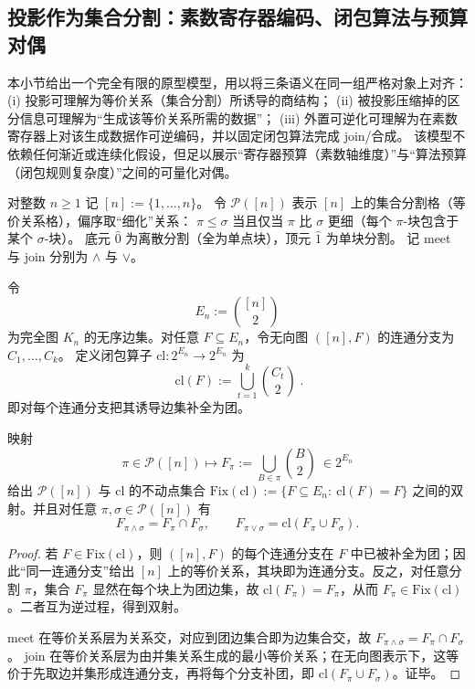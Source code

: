 \subsection{投影作为集合分割：素数寄存器编码、闭包算法与预算对偶}\label{subsec:pom-projection-as-partition-prime-register}
本小节给出一个完全有限的原型模型，用以将三条语义在同一组严格对象上对齐：
(i) 投影可理解为等价关系（集合分割）所诱导的商结构；
(ii) 被投影压缩掉的区分信息可理解为“生成该等价关系所需的数据”；
(iii) 外置可逆化可理解为在素数寄存器上对该生成数据作可逆编码，并以固定闭包算法完成 join/合成。
该模型不依赖任何渐近或连续化假设，但足以展示“寄存器预算（素数轴维度）”与“算法预算（闭包规则复杂度）”之间的可量化对偶。

\begin{definition}[集合分割格]\label{def:pom-partition-lattice}
对整数 \(n\ge 1\) 记 \([n]:=\{1,\dots,n\}\)。
令 \(\mathcal{P}([n])\) 表示 \([n]\) 上的集合分割格（等价关系格），偏序取“细化”关系：
\(\pi\le\sigma\) 当且仅当 \(\pi\) 比 \(\sigma\) 更细（每个 \(\pi\)-块包含于某个 \(\sigma\)-块）。
底元 \(\hat 0\) 为离散分割（全为单点块），顶元 \(\hat 1\) 为单块分割。
记 meet 与 join 分别为 \(\wedge\) 与 \(\vee\)。
\end{definition}

\begin{definition}[边集与等价闭包]\label{def:pom-edge-closure}
令
\[
E_n:=\binom{[n]}2
\]
为完全图 \(K_n\) 的无序边集。对任意 \(F\subseteq E_n\)，令无向图 \(([n],F)\) 的连通分支为 \(C_1,\dots,C_k\)。
定义闭包算子 \(\mathrm{cl}:2^{E_n}\to 2^{E_n}\) 为
\[
\boxed{\;
\mathrm{cl}(F):=\bigcup_{t=1}^{k}\binom{C_t}{2}\; }.
\]
即对每个连通分支把其诱导边集补全为团。
\end{definition}

\begin{proposition}[闭包不动点与集合分割的一一对应]\label{prop:pom-closure-fixedpoints-partitions}
映射
\[
\pi\in\mathcal{P}([n])\longmapsto
F_\pi:=\bigcup_{B\in\pi}\binom{B}{2}\ \in 2^{E_n}
\]
给出 \(\mathcal{P}([n])\) 与 \(\mathrm{cl}\) 的不动点集合
\(
\mathrm{Fix}(\mathrm{cl}):=\{F\subseteq E_n:\ \mathrm{cl}(F)=F\}
\)
之间的双射。并且对任意 \(\pi,\sigma\in\mathcal{P}([n])\) 有
\[
F_{\pi\wedge\sigma}=F_\pi\cap F_\sigma,
\qquad
F_{\pi\vee\sigma}=\mathrm{cl}(F_\pi\cup F_\sigma).
\]
\end{proposition}
\begin{proof}
若 \(F\in\mathrm{Fix}(\mathrm{cl})\)，则 \(([n],F)\) 的每个连通分支在 \(F\) 中已被补全为团；因此“同一连通分支”给出 \([n]\) 上的等价关系，其块即为连通分支。反之，对任意分割 \(\pi\)，集合 \(F_\pi\) 显然在每个块上为团边集，故 \(\mathrm{cl}(F_\pi)=F_\pi\)，从而 \(F_\pi\in\mathrm{Fix}(\mathrm{cl})\)。二者互为逆过程，得到双射。
\par
meet 在等价关系层为关系交，对应到团边集合即为边集合交，故 \(F_{\pi\wedge\sigma}=F_\pi\cap F_\sigma\)。
join 在等价关系层为由并集关系生成的最小等价关系；在无向图表示下，这等价于先取边并集形成连通分支，再将每个分支补团，即 \(\mathrm{cl}(F_\pi\cup F_\sigma)\)。证毕。
\end{proof}

